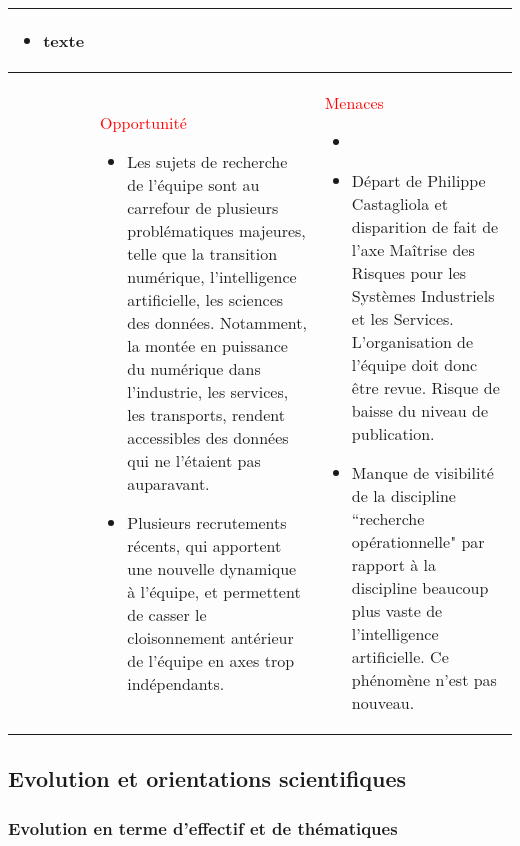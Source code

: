\begin{table}[H]
\begin{tabularx}{\textwidth}{|>{\centering\arraybackslash}l|>{\centering\arraybackslash}X|>{\centering\arraybackslash}X|}
\begin{itemize}
			\item  texte
			\end{itemize}\\
			\hline
			\centering\color{red}\parbox[t]{2mm}{} & \centering\textcolor{red}{Opportunité} 
			\smallskip
			\begin{itemize} 
			\item  Les sujets de recherche de l'équipe sont au carrefour de plusieurs problématiques majeures, telle que la transition numérique, l'intelligence artificielle, les sciences des données. Notamment, la montée en puissance du numérique dans l'industrie, les services, les transports, rendent accessibles des données qui ne l'étaient pas auparavant. 
			\item  Plusieurs recrutements récents, qui apportent une nouvelle dynamique à l'équipe, et permettent de casser le cloisonnement antérieur de l'équipe en axes trop indépendants.
			\end{itemize} & \textcolor{red}{Menaces}
			\smallskip
			\begin{itemize} 
			\item 
			\item  Départ de Philippe Castagliola et disparition de fait de l'axe Maîtrise des Risques pour les Systèmes Industriels et les Services. L'organisation de l'équipe doit donc être revue. Risque de baisse du niveau de publication. 
			\item Manque de visibilité de la discipline ``recherche opérationnelle" par rapport à la discipline beaucoup plus vaste 
			de l'intelligence artificielle. Ce phénomène n'est pas nouveau. 
			\end{itemize}\\
			\hline
			\end{tabularx}
			\end{table}
		 

		\subsection{Evolution et orientations scientifiques}
		
		
		\subsubsection{Evolution en terme d'effectif et de thématiques}
		
